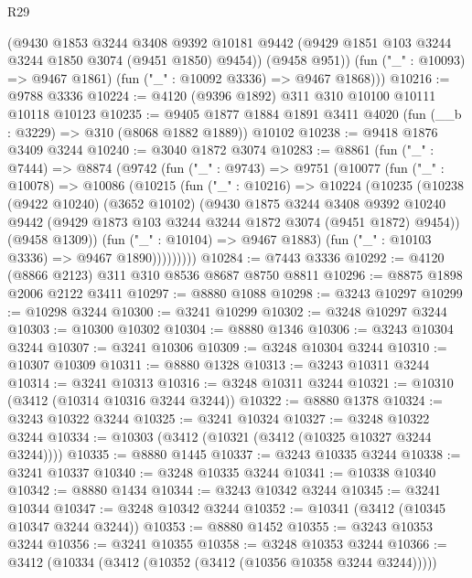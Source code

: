 \begin{lexlean}{R29}
\begin{coremodule}
          (@9430
            @1853
            @3244
            @3408
            @9392
            @10181
            @9442
            (@9429 @1851 @103 @3244 @3244 @1850 @3074 (@9451 @1850) @9454))
          (@9458 @951))
        (fun ("_" : @10093) => @9467 @1861)
        (fun ("_" : @10092 @3336) => @9467 @1868)))
@10216 := @9788 @3336
@10224 := @4120 (@9396 @1892) @311 @310 @10100 @10111 @10118 @10123
@10235 := @9405 @1877 @1884 @1891 @3411 @4020 (fun (__b : @3229) => @310 (@8068 @1882 @1889)) @10102
@10238 := @9418 @1876 @3409 @3244
@10240 := @3040 @1872 @3074
@10283 := @8861
    (fun ("_" : @7444) =>
    @8874
      (@9742
        (fun ("_" : @9743) =>
        @9751
          (@10077
            (fun ("_" : @10078) =>
            @10086
              (@10215
                (fun ("_" : @10216) =>
                @10224
                  (@10235
                    (@10238
                      (@9422 @10240)
                      (@3652 @10102)
                      (@9430
                        @1875
                        @3244
                        @3408
                        @9392
                        @10240
                        @9442
                        (@9429 @1873 @103 @3244 @3244 @1872 @3074 (@9451 @1872) @9454))
                      (@9458 @1309))
                    (fun ("_" : @10104) => @9467 @1883)
                    (fun ("_" : @10103 @3336) => @9467 @1890)))))))))
@10284 := @7443 @3336
@10292 := @4120 (@8866 @2123) @311 @310 @8536 @8687 @8750 @8811
@10296 := @8875 @1898 @2006 @2122 @3411
@10297 := @8880 @1088
@10298 := @3243 @10297
@10299 := @10298 @3244
@10300 := @3241 @10299
@10302 := @3248 @10297 @3244
@10303 := @10300 @10302
@10304 := @8880 @1346
@10306 := @3243 @10304 @3244
@10307 := @3241 @10306
@10309 := @3248 @10304 @3244
@10310 := @10307 @10309
@10311 := @8880 @1328
@10313 := @3243 @10311 @3244
@10314 := @3241 @10313
@10316 := @3248 @10311 @3244
@10321 := @10310 (@3412 (@10314 @10316 @3244 @3244))
@10322 := @8880 @1378
@10324 := @3243 @10322 @3244
@10325 := @3241 @10324
@10327 := @3248 @10322 @3244
@10334 := @10303 (@3412 (@10321 (@3412 (@10325 @10327 @3244 @3244))))
@10335 := @8880 @1445
@10337 := @3243 @10335 @3244
@10338 := @3241 @10337
@10340 := @3248 @10335 @3244
@10341 := @10338 @10340
@10342 := @8880 @1434
@10344 := @3243 @10342 @3244
@10345 := @3241 @10344
@10347 := @3248 @10342 @3244
@10352 := @10341 (@3412 (@10345 @10347 @3244 @3244))
@10353 := @8880 @1452
@10355 := @3243 @10353 @3244
@10356 := @3241 @10355
@10358 := @3248 @10353 @3244
@10366 := @3412 (@10334 (@3412 (@10352 (@3412 (@10356 @10358 @3244 @3244)))))

\end{coremodule}
\end{lexlean}
